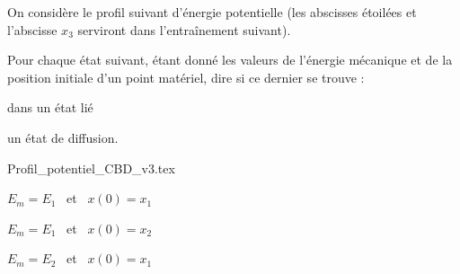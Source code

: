 On considère le profil suivant d'énergie potentielle (les abscisses étoilées et l'abscisse $x_3$ serviront dans l'entraînement suivant). 

Pour chaque état suivant, étant donné les valeurs de l'énergie mécanique et de la position initiale d'un point matériel, dire si ce dernier se trouve :
	\begin{listeQCM2Colonnes}
	\item dans un état lié
	\item un état de diffusion.
	\end{listeQCM2Colonnes}

\smallskip

\begin{center}
{Profil_potentiel_CBD_v3.tex}
\end{center}

\debutEntrainement


\begin{enonce}
$E_m=E_1$ \ et \ $ x(0)=x_1$
\end{enonce}

\reponse{\reponseA{}}




\begin{enonce}
$E_m=E_1$ \ et \ $ x(0)=x_2$
\end{enonce}

\reponse{\reponseA{}}




\begin{enonce}
$E_m=E_2$ \ et \ $ x(0)=x_1$
\end{enonce}

\reponse{\reponseA{}}



